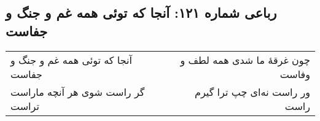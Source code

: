 \begin{center}
\section*{رباعی شماره ۱۲۱: آنجا که توئی همه غم و جنگ و جفاست}
\label{sec:0121}
\begin{longtable}{l p{0.5cm} r}
آنجا که توئی همه غم و جنگ و جفاست
&&
چون غرقهٔ ما شدی همه لطف و وفاست
\\
گر راست شوی هر آنچه ماراست تراست
&&
ور راست نه‌ای چپ ترا گیرم راست
\\
\end{longtable}
\end{center}
